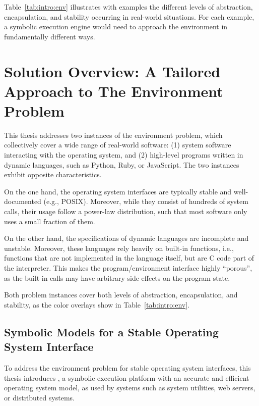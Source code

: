 Table~\ref{tab:intro:env} illustrates with examples the different levels of abstraction, encapsulation, and stability occurring in real-world situations.  For each example, a symbolic execution engine would need to approach the environment in fundamentally different ways.


\section{Solution Overview: A Tailored Approach to The Environment Problem}

This thesis addresses two instances of the environment problem, which collectively cover a wide range of real-world software: (1) system software interacting with the operating system, and (2) high-level programs written in dynamic languages, such as Python, Ruby, or JavaScript.
%
The two instances exhibit opposite characteristics.

On the one hand, the operating system interfaces are typically stable and well-documented (e.g., POSIX).  Moreover, while they consist of hundreds of system calls, their usage follow a power-law distribution, such that most software only uses a small fraction of them.

On the other hand, the specifications of dynamic languages are incomplete and unstable.
%
Moreover, these languages rely heavily on built-in functions, i.e., functions that are not implemented in the language itself, but are C code part of the interpreter.  This makes the program/environment interface highly ``porous'', as the built-in calls may have arbitrary side effects on the program state.

Both problem instances cover both levels of abstraction, encapsulation, and stability, as the color overlays show in Table~\ref{tab:intro:env}.

\subsection{Symbolic Models for a Stable Operating System Interface}

To address the environment problem for stable operating system interfaces, this thesis introduces \cnine, a symbolic execution platform with an accurate and efficient operating system model, as used by systems such as system utilities, web servers, or distributed systems.

